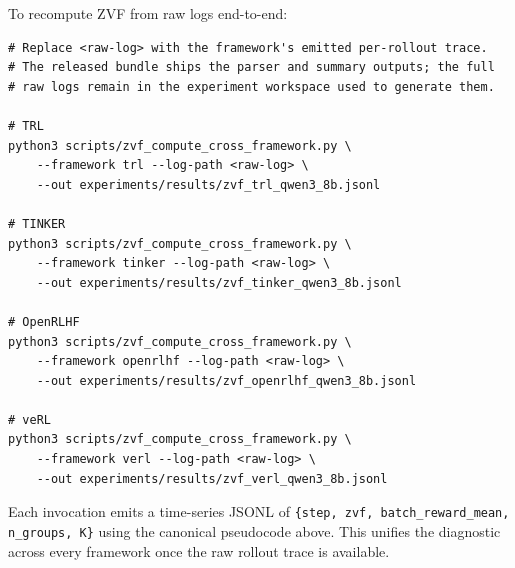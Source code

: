 To recompute ZVF from raw logs end-to-end:
\begin{verbatim}
# Replace <raw-log> with the framework's emitted per-rollout trace.
# The released bundle ships the parser and summary outputs; the full
# raw logs remain in the experiment workspace used to generate them.

# TRL
python3 scripts/zvf_compute_cross_framework.py \
    --framework trl --log-path <raw-log> \
    --out experiments/results/zvf_trl_qwen3_8b.jsonl

# TINKER
python3 scripts/zvf_compute_cross_framework.py \
    --framework tinker --log-path <raw-log> \
    --out experiments/results/zvf_tinker_qwen3_8b.jsonl

# OpenRLHF
python3 scripts/zvf_compute_cross_framework.py \
    --framework openrlhf --log-path <raw-log> \
    --out experiments/results/zvf_openrlhf_qwen3_8b.jsonl

# veRL
python3 scripts/zvf_compute_cross_framework.py \
    --framework verl --log-path <raw-log> \
    --out experiments/results/zvf_verl_qwen3_8b.jsonl
\end{verbatim}
Each invocation emits a time-series JSONL of
\texttt{\{step, zvf, batch\_reward\_mean, n\_groups, K\}} using the
canonical pseudocode above. This unifies the diagnostic across every
framework once the raw rollout trace is available.
